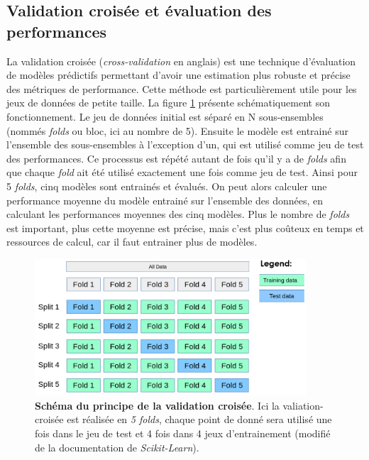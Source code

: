 \subsection{Validation croisée et évaluation des performances}
La validation croisée (\textit{cross-validation }en anglais) est une technique d'évaluation de modèles prédictifs permettant d'avoir une estimation plus robuste et précise des métriques de performance. Cette méthode est particulièrement utile pour les jeux de données de petite taille. La figure \ref{fig:cross-val} présente schématiquement son fonctionnement. Le jeu de données initial est séparé en N sous-ensembles (nommés \textit{folds} ou bloc, ici au nombre de 5). Ensuite le modèle est entrainé sur l'ensemble des sous-ensembles à l'exception d’un, qui est utilisé comme jeu de test des performances. Ce processus est répété autant de fois qu'il y a de \textit{folds} afin que chaque \textit{fold} ait été utilisé exactement une fois comme jeu de test. Ainsi pour 5 \textit{folds}, cinq modèles sont entrainés et évalués. On peut alors calculer une performance moyenne du modèle entrainé sur l'ensemble des données, en calculant les performances moyennes des cinq modèles. Plus le nombre de \textit{folds} est important, plus cette moyenne est précise, mais c'est plus coûteux en temps et ressources de calcul, car il faut entrainer plus de modèles.
\begin{figure}[!ht]
 \centering
 \includegraphics[width=0.9\textwidth]{figures/cross-val.png}
 \caption[Schéma validation-croisée]{\textbf{Schéma du principe de la validation croisée}. Ici la valiation-croisée est réalisée en \textit{5 folds}, chaque point de donné sera utilisé une fois dans le jeu de test et 4 fois dans 4 jeux d'entrainement (modifié de la documentation de \textit{Scikit-Learn}).}
 \label{fig:cross-val}
\end{figure}
